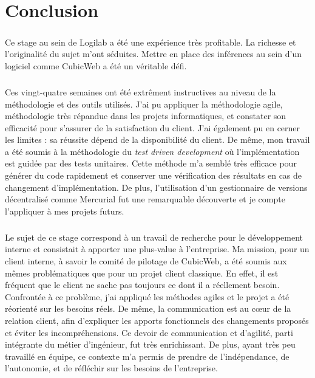 \documentclass {report}
\begin{document}

\chapter{Conclusion}
\paragraph{}
Ce stage au sein de Logilab a été une expérience très profitable. La richesse et l'originalité du sujet m'ont séduites. Mettre en place des inférences au sein d'un logiciel comme CubicWeb a été un véritable défi. 

\paragraph{}
Ces vingt-quatre semaines ont été extrêment instructives au niveau de la méthodologie et des outils utilisés. J'ai pu appliquer la méthodologie agile, méthodologie très répandue dans les projets informatiques, et constater son efficacité pour s'assurer de la satisfaction du client. J'ai également pu en cerner les limites : sa réussite dépend de la disponibilité du client. De même, mon travail a été soumis à la méthodologie du \textit{test driven development} où l'implémentation est guidée par des tests unitaires. Cette méthode m'a semblé très efficace pour générer du code rapidement et conserver une vérification des résultats en cas de changement d'implémentation. De plus, l'utilisation d'un gestionnaire de versions décentralisé comme Mercurial fut une remarquable découverte et je compte l'appliquer à mes projets futurs.

\paragraph{}
Le sujet de ce stage correspond à un travail de recherche pour le développement interne et consistait à apporter une plus-value à l'entreprise. Ma mission, pour un client interne, à savoir le comité de pilotage de CubicWeb, a été soumis aux mêmes problématiques que pour un projet client classique. En effet, il est fréquent que le client ne sache pas toujours ce dont il a réellement besoin. Confrontée à ce problème, j'ai appliqué les méthodes agiles et le projet a été réorienté sur les besoins réels. De même, la communication est au cœur de la relation client, afin d'expliquer les apports fonctionnels des changements proposés et éviter les incompréhensions. Ce devoir de communication et d'agilité, parti intégrante du métier d'ingénieur, fut très enrichissant. De plus, ayant très peu travaillé en équipe, ce contexte m'a permis de prendre de l'indépendance, de l'autonomie, et de réfléchir sur les besoins de l'entreprise.
\end{document}
